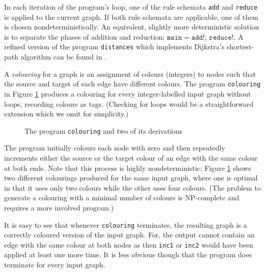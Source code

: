 In each iteration of the program's loop, one of the rule schemata \texttt{add} and \texttt{reduce} is applied to the current graph. If both rule schemata are applicable, one of them is chosen nondeterministically. An equivalent, slightly more deterministic solution is to separate the phases of addition and reduction: $\mathtt{main} = \mathtt{add!;\, reduce!}$. A refined version of the program \texttt{distances} which implements Dijkstra's shortest-path algorithm can be found in \cite{Plump-Steinert04a}.

\begin{example}[Colouring]
\label{ex:colouring}
A \emph{colouring} for a graph is an assignment of colours (integers) to nodes such that the source and target of each edge have different colours. The program \texttt{colouring} in Figure \ref{fig:colouring} produces a colouring for every integer-labelled input graph without loops, recording colours as tags. (Checking for loops would be a straightforward extension which we omit for simplicity.) 

\begin{figure}[htbp]
\label{fig:colouring}
 \begin{center}
  
  \vspace*{1.5cm}
  
 \end{center}
\caption{The program \texttt{colouring} and two of its derivations}
\end{figure}

The program initially colours each node with zero and then repeatedly increments either the source or the target colour of an edge with the same colour at both ends. Note that this process is highly nondeterministic: Figure \ref{fig:colouring} shows two different colourings produced for the same input graph, where one is optimal in that it uses only two colours while the other uses four colours. (The problem to generate a colouring with a minimal number of colours is NP-complete \cite{Garey-Johnson79a} and requires a more involved program.)

It is easy to see that whenever \texttt{colouring} terminates, the resulting graph is a correctly coloured version of the input graph. For, the output cannot contain an edge with the same colour at both nodes as then \texttt{inc1} or \texttt{inc2} would have been applied at least one more time. It is less obvious though that the program does terminate for every input graph. 


\end{example}
